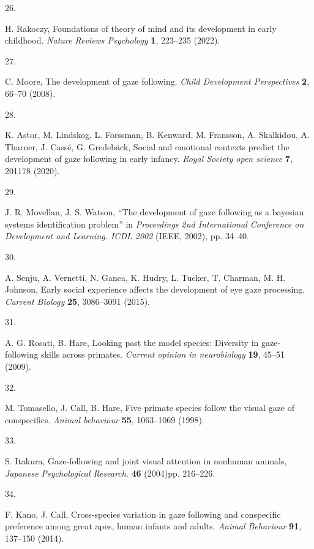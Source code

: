 \documentclass[
  man,floatsintext]{apa6}
\newlength{\cslhangindent}
\newlength{\csllabelwidth}
\newlength{\cslentryspacingunit} %
\newenvironment{CSLReferences}[2] %
 {%
  \setlength{\parindent}{0pt}
  \ifodd #1
  \let\oldpar\par
  \def\par{\hangindent=\cslhangindent\oldpar}
  \fi
  \setlength{\parskip}{#2\cslentryspacingunit}
 }%
 {}
\newcommand{\CSLLeftMargin}[1]{\parbox[t]{\csllabelwidth}{#1}}
\newcommand{\CSLRightInline}[1]{\parbox[t]{\linewidth - \csllabelwidth}{#1}\break}
\begin{document}
\begin{CSLReferences}{0}{0}
\leavevmode{}%
\CSLLeftMargin{26. }%
\CSLRightInline{H. Rakoczy, Foundations of theory of mind and its development in early childhood. \emph{Nature Reviews Psychology} \textbf{1}, 223--235 (2022).}

\leavevmode{}%
\CSLLeftMargin{27. }%
\CSLRightInline{C. Moore, The development of gaze following. \emph{Child Development Perspectives} \textbf{2}, 66--70 (2008).}

\leavevmode{}%
\CSLLeftMargin{28. }%
\CSLRightInline{K. Astor, M. Lindskog, L. Forssman, B. Kenward, M. Fransson, A. Skalkidou, A. Tharner, J. Cassé, G. Gredebäck, Social and emotional contexts predict the development of gaze following in early infancy. \emph{Royal Society open science} \textbf{7}, 201178 (2020).}

\leavevmode{}%
\CSLLeftMargin{29. }%
\CSLRightInline{J. R. Movellan, J. S. Watson, {``The development of gaze following as a bayesian systems identification problem''} in \emph{Proceedings 2nd International Conference on Development and Learning. ICDL 2002} (IEEE, 2002), pp. 34--40.}

\leavevmode{}%
\CSLLeftMargin{30. }%
\CSLRightInline{A. Senju, A. Vernetti, N. Ganea, K. Hudry, L. Tucker, T. Charman, M. H. Johnson, Early social experience affects the development of eye gaze processing. \emph{Current Biology} \textbf{25}, 3086--3091 (2015).}

\leavevmode{}%
\CSLLeftMargin{31. }%
\CSLRightInline{A. G. Rosati, B. Hare, Looking past the model species: Diversity in gaze-following skills across primates. \emph{Current opinion in neurobiology} \textbf{19}, 45--51 (2009).}

\leavevmode{}%
\CSLLeftMargin{32. }%
\CSLRightInline{M. Tomasello, J. Call, B. Hare, Five primate species follow the visual gaze of conspecifics. \emph{Animal behaviour} \textbf{55}, 1063--1069 (1998).}

\leavevmode{}%
\CSLLeftMargin{33. }%
\CSLRightInline{S. Itakura, Gaze-following and joint visual attention in nonhuman animals, \emph{Japanese Psychological Research}. \textbf{46} (2004)pp. 216--226.}

\leavevmode{}%
\CSLLeftMargin{34. }%
\CSLRightInline{F. Kano, J. Call, Cross-species variation in gaze following and conspecific preference among great apes, human infants and adults. \emph{Animal Behaviour} \textbf{91}, 137--150 (2014).}


\end{CSLReferences}
\end{document}
